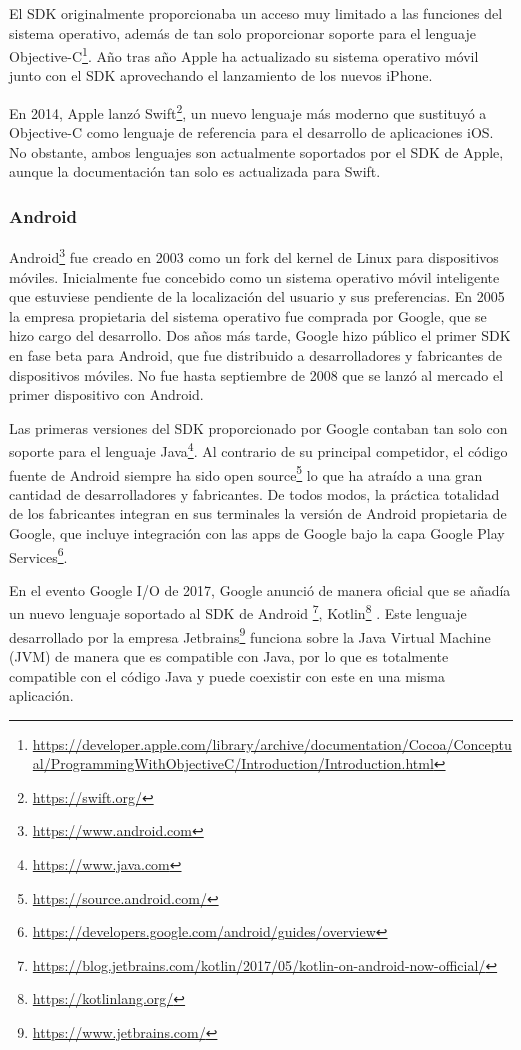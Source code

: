 \documentclass[a4paper, 12pt]{article}
\begin{document}
El SDK originalmente proporcionaba un acceso muy limitado a las funciones del sistema operativo,
además de tan solo proporcionar soporte para el lenguaje Objective-C\footnote{\url{https://developer.apple.com/library/archive/documentation/Cocoa/Conceptual/ProgrammingWithObjectiveC/Introduction/Introduction.html}}. Año tras año Apple ha
actualizado su sistema operativo móvil junto con el SDK aprovechando el lanzamiento de los nuevos iPhone.

En 2014, Apple lanzó Swift\footnote{\url{https://swift.org/}}, un nuevo lenguaje más moderno que sustituyó a Objective-C como
lenguaje de referencia para el desarrollo de aplicaciones iOS. No obstante, ambos lenguajes son actualmente
soportados por el SDK de Apple, aunque la documentación tan solo es actualizada para Swift.
\subsubsection{Android}
\label{sec-2-1-2}
Android\footnote{\url{https://www.android.com}} fue creado en 2003 como un fork del kernel de Linux para dispositivos
móviles. Inicialmente fue concebido como un sistema operativo móvil inteligente que
estuviese pendiente de la localización del usuario y sus preferencias. En 2005 la
empresa propietaria del sistema operativo fue comprada por Google, que se hizo cargo
del desarrollo. Dos años más tarde, Google hizo público el primer SDK en fase beta
para Android, que fue distribuido a desarrolladores y fabricantes de dispositivos
móviles. No fue hasta septiembre de 2008 que se lanzó al mercado el primer dispositivo
con Android.

Las primeras versiones del SDK proporcionado por Google contaban tan solo con
soporte para el lenguaje Java\footnote{\url{https://www.java.com}}. Al contrario de su principal competidor, el código fuente
de Android siempre ha sido open source\footnote{\url{https://source.android.com/}} lo que ha atraído a una gran cantidad de
desarrolladores y fabricantes. De todos modos, la práctica totalidad de los fabricantes
integran en sus terminales la versión de Android propietaria de Google, que incluye
integración con las apps de Google bajo la capa Google Play Services\footnote{\url{https://developers.google.com/android/guides/overview}}.

En el evento Google I/O de 2017, Google anunció de manera oficial que se añadía un
nuevo lenguaje soportado al SDK de Android \footnote{\url{https://blog.jetbrains.com/kotlin/2017/05/kotlin-on-android-now-official/}}, Kotlin\footnote{\url{https://kotlinlang.org/}} . Este lenguaje desarrollado
por la empresa Jetbrains\footnote{\url{https://www.jetbrains.com/}} funciona sobre la Java Virtual Machine (JVM) de manera que
es compatible con Java, por lo que es totalmente compatible con el código Java y puede
coexistir con este en una misma aplicación.
\end{document}
